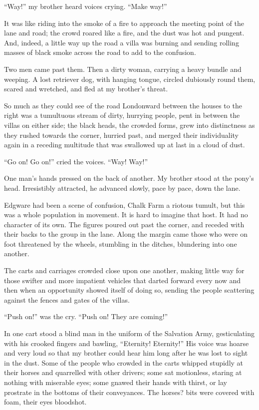 ``Way!'' my brother heard voices crying. ``Make way!''

It was like riding into the smoke of a fire to approach the meeting
point of the lane and road; the crowd roared like a fire, and the
dust was hot and pungent. And, indeed, a little way up the road a
villa was burning and sending rolling masses of black smoke across
the road to add to the confusion.

Two men came past them. Then a dirty woman, carrying a heavy bundle
and weeping. A lost retriever dog, with hanging tongue, circled
dubiously round them, scared and wretched, and fled at my brother's
threat.

So much as they could see of the road Londonward between the houses
to the right was a tumultuous stream of dirty, hurrying people,
pent in between the villas on either side; the black heads, the
crowded forms, grew into distinctness as they rushed towards the
corner, hurried past, and merged their individuality again in a
receding multitude that was swallowed up at last in a cloud of
dust.

``Go on! Go on!'' cried the voices. ``Way! Way!''

One man's hands pressed on the back of another. My brother stood at
the pony's head. Irresistibly attracted, he advanced slowly, pace
by pace, down the lane.

Edgware had been a scene of confusion, Chalk Farm a riotous tumult,
but this was a whole population in movement. It is hard to imagine
that host. It had no character of its own. The figures poured out
past the corner, and receded with their backs to the group in the
lane. Along the margin came those who were on foot threatened by
the wheels, stumbling in the ditches, blundering into one another.

The carts and carriages crowded close upon one another, making
little way for those swifter and more impatient vehicles that
darted forward every now and then when an opportunity showed itself
of doing so, sending the people scattering against the fences and
gates of the villas.

``Push on!'' was the cry. ``Push on! They are coming!''

In one cart stood a blind man in the uniform of the Salvation Army,
gesticulating with his crooked fingers and bawling, ``Eternity!
Eternity!'' His voice was hoarse and very loud so that my brother
could hear him long after he was lost to sight in the dust. Some of
the people who crowded in the carts whipped stupidly at their
horses and quarrelled with other drivers; some sat motionless,
staring at nothing with miserable eyes; some gnawed their hands
with thirst, or lay prostrate in the bottoms of their conveyances.
The horses? bits were covered with foam, their eyes bloodshot.

